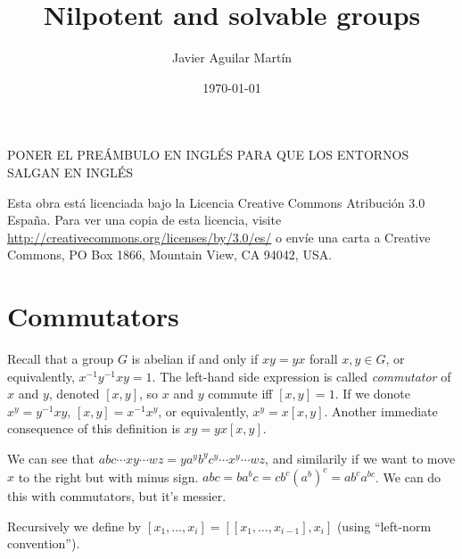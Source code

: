 \documentclass[twoside, 11pt]{article}
\begin{document}

\author{Javier Aguilar Martín }
\date{\today}
\title{Nilpotent and solvable groups}

\maketitle


\begin{abstract}

\end{abstract}
PONER EL PREÁMBULO EN INGLÉS PARA QUE LOS ENTORNOS SALGAN EN INGLÉS

	\vfill
	Esta obra está licenciada bajo la Licencia Creative Commons Atribución 3.0 España. Para ver una copia de esta licencia, visite \url{http://creativecommons.org/licenses/by/3.0/es/} o envíe una carta a Creative Commons, PO Box 1866, Mountain View, CA 94042, USA.


\newpage
\tableofcontents

\newpage


\section{Commutators}
Recall that a group $G$ is abelian if and only if $xy=yx$ forall $x,y\in G$, or equivalently, $x^{-1}y^{-1}xy=1$. The left-hand side expression is called \emph{commutator} of $x$ and $y$, denoted $[x,y]$, so $x$ and $y$ commute iff $[x,y]=1$. If we donote $x^y=y^{-1}xy$, $[x,y]=x^{-1}x^y$, or equivalently, $x^y=x[x,y]$. Another immediate consequence of this definition is $xy=yx[x,y]$.

We can see that $abc\cdots xy\cdots wz=y a^yb^y c^y\cdots x^y\cdots wz$, and similarily if we want to move $x$ to the right but with minus sign. $abc=ba^bc=cb^c(a^b)^c=ab^ca^{bc}$. We can do this with commutators, but it's messier.

Recursively we define by $[x_1,\dots, x_i]=[[x_1,\dots, x_{i-1}],x_i]$ (using ``left-norm convention''). 
\end{document}
